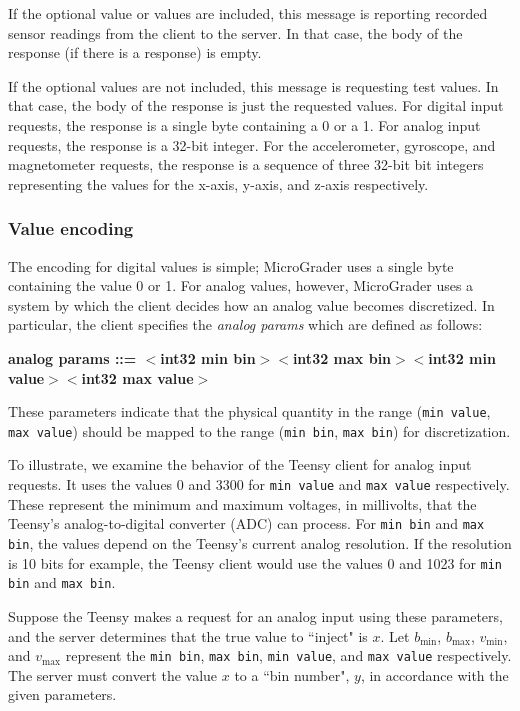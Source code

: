 \documentclass[12pt]{article}
\begin{document}
\begin{appendices}
If the optional value or values are included, this message is reporting recorded sensor readings from the client to the server.  In that case, the body of the response (if there is a response) is empty.  

If the optional values are not included, this message is requesting test values.  In that case, the body of the response is just the requested values.  For digital input requests, the response is a single byte containing a 0 or a 1.  For analog input requests, the response is a 32-bit integer.  For the accelerometer, gyroscope, and magnetometer requests, the response is a sequence of three 32-bit bit integers representing the values for the x-axis, y-axis, and z-axis respectively.

\subsubsection{Value encoding}
The encoding for digital values is simple; MicroGrader uses a single byte containing the value 0 or 1.  For analog values, however, MicroGrader uses a system by which the client decides how an analog value becomes discretized.  In particular, the client specifies the \textit{analog params} which are defined as follows:

\footnotesize
\textbf{analog params ::= $<$int32 min bin$>$$<$int32 max bin$>$$<$int32 min value$>$$<$int32 max value$>$}
\normalsize

\noindent These parameters indicate that the physical quantity in the range (\texttt{min value}, \texttt{max value}) should be mapped to the range (\texttt{min bin}, \texttt{max bin}) for discretization.

To illustrate, we examine the behavior of the Teensy client for analog input requests.  It uses the values 0 and 3300 for \texttt{min value} and \texttt{max value} respectively.  These represent the minimum and maximum voltages, in millivolts, that the Teensy's analog-to-digital converter (ADC) can process.  For \texttt{min bin} and \texttt{max bin}, the values depend on the Teensy's current analog resolution.  If the resolution is 10 bits for example, the Teensy client would use the values 0 and 1023 for \texttt{min bin} and \texttt{max bin}.

Suppose the Teensy makes a request for an analog input using these parameters, and the server determines that the true value to ``inject" is $x$.  Let $b_{\text{min}}$, $b_{\text{max}}$, $v_{\text{min}}$, and $v_{\text{max}}$ represent the \texttt{min bin}, \texttt{max bin}, \texttt{min value}, and \texttt{max value} respectively.  The server must convert the value $x$ to a ``bin number", $y$, in accordance with the given parameters.


\end{appendices}
\end{document}
